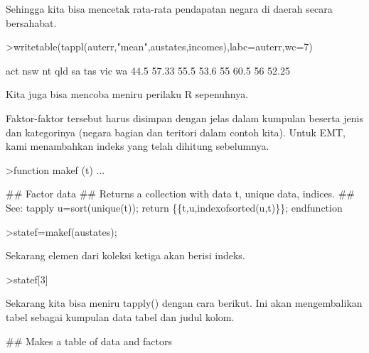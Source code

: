 \documentclass[a4paper,10pt]{article}
\begin{document}
\begin{eulernotebook}
\begin{eulercomment}
\begin{eulercomment}
\begin{eulercomment}
Sehingga kita bisa mencetak rata-rata pendapatan negara di daerah
secara bersahabat.
\end{eulercomment}
\begin{eulerprompt}
>writetable(tappl(auterr,"mean",austates,incomes),labc=auterr,wc=7)
\end{eulerprompt}
\begin{euleroutput}
      act    nsw     nt    qld     sa    tas    vic     wa
     44.5  57.33   55.5   53.6     55   60.5     56  52.25
\end{euleroutput}
\begin{eulercomment}
Kita juga bisa mencoba meniru perilaku R sepenuhnya.

Faktor-faktor tersebut harus disimpan dengan jelas dalam kumpulan
beserta jenis dan kategorinya (negara bagian dan teritori dalam contoh
kita). Untuk EMT, kami menambahkan indeks yang telah dihitung
sebelumnya.
\end{eulercomment}
\begin{eulerprompt}
>function makef (t) ...
\end{eulerprompt}
\begin{eulerudf}
  ## Factor data
  ## Returns a collection with data t, unique data, indices.
  ## See: tapply
  u=sort(unique(t));
  return \{\{t,u,indexofsorted(u,t)\}\};
  endfunction
\end{eulerudf}
\begin{eulerprompt}
>statef=makef(austates);
\end{eulerprompt}
\begin{eulercomment}
Sekarang elemen dari koleksi ketiga akan berisi indeks.
\end{eulercomment}
\begin{eulerprompt}
>statef[3]
\end{eulerprompt}
\begin{euleroutput}
  [6,  5,  4,  2,  2,  3,  8,  8,  4,  7,  2,  7,  4,  4,  5,  6,  5,  3,  8,  7,  4,  2,  2,  8,
  5,  1,  2,  7,  7,  1]
\end{euleroutput}
\begin{eulercomment}
Sekarang kita bisa meniru tapply() dengan cara berikut. Ini akan
mengembalikan tabel sebagai kumpulan data tabel dan judul kolom.
\end{eulercomment}
\begin{eulerudf}
  ## Makes a table of data and factors

\end{eulerudf}
\end{eulercomment}
\end{eulercomment}
\end{eulernotebook}
\end{document}

